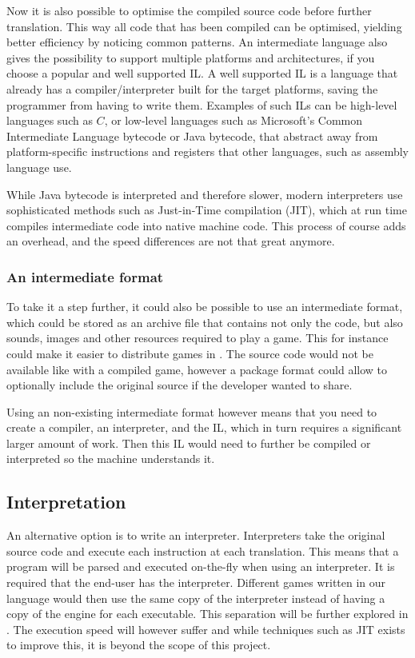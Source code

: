 

Now it is also possible to optimise the compiled source code before
further translation. This way all
code that has been compiled can be optimised, yielding better
efficiency by noticing common patterns. An intermediate language also
gives the possibility to support multiple platforms and architectures,
if you choose a popular and well supported IL. A well supported IL is a
language that already has a compiler/interpreter built for the target
platforms, saving the programmer from having to write them. Examples
of such ILs can be high-level languages such as $C$, or low-level
languages such as Microsoft's Common Intermediate Language bytecode or
Java bytecode, that abstract away from platform-specific instructions and
registers that other languages, such as assembly language use.

While Java bytecode is interpreted and therefore slower, modern interpreters
use sophisticated methods such as Just-in-Time compilation (JIT), which at
run time compiles intermediate code into native machine code. This process of
course adds an overhead, and the speed differences are not that great
anymore\cite{java-speed}.

\subsubsection{An intermediate format}
To take it a step further, it could also be possible to use an
intermediate format, which could be stored as an archive file that
contains not only the code, but also sounds, images and other resources
required to play a game. This for instance could make it easier to
distribute games in \productname{}. The source code would not be
available like with a compiled game, however a package format could
allow to optionally include the original source if the developer wanted
to share.

Using an non-existing intermediate format however means that you need to
create a compiler, an interpreter, and the IL, which in turn requires a
significant larger amount of work. Then this IL would need to further be
compiled or interpreted so the machine understands it.

\subsection{Interpretation}
\label{sec:interpretation}
An alternative option is to write an interpreter. Interpreters take the
original source code and execute each instruction at each translation.
This means that a program will be parsed and executed on-the-fly
when using an interpreter. It is required that the end-user has the
interpreter. Different games written in our language would then use
the same copy of the interpreter instead of having a copy of the
engine for each executable. This separation will be further explored
in . The execution speed will however
suffer and while techniques such as JIT exists to improve this, it is
beyond the scope of this project.

